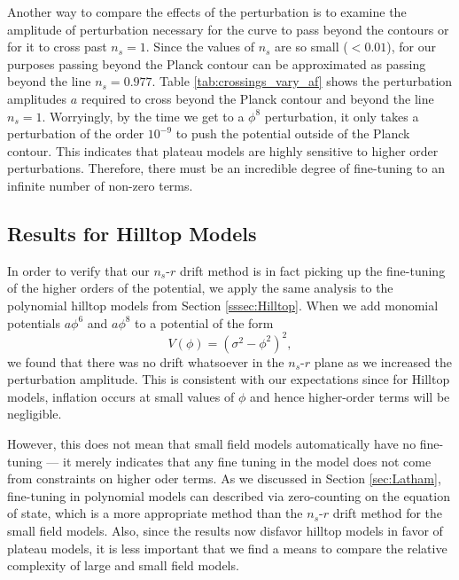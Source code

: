 \documentclass[a4paper,11pt]{article}
\def\nsr{$n_s$-$r$ }
\begin{document}
\newpage
Another way to compare the effects of the perturbation is to examine the amplitude of perturbation necessary for the curve to pass beyond the \citet{Planck2015} contours or for it to cross past $n_s=1$. Since the values of $n_s$ are so small ($<0.01$), for our purposes passing beyond the Planck contour can be approximated as passing beyond the line $n_s=0.977$. Table \ref{tab:crossings_vary_af} shows the perturbation amplitudes $a$ required to cross beyond the Planck contour and beyond the line $n_s=1$. Worryingly, by the time we get to a $\phi^8$ perturbation, it only takes a perturbation of the order $10^{-9}$ to push the potential outside of the Planck contour. This indicates that plateau models are highly sensitive to higher order perturbations. Therefore, there must be an incredible degree of fine-tuning to an infinite number of non-zero terms. 


\subsection{Results for Hilltop Models}
\label{ssec:HilltopDrift}

In order to verify that our \nsr drift method is in fact picking up the fine-tuning of the higher orders of the potential, we apply the same analysis to the polynomial hilltop models from Section \ref{sssec:Hilltop}. When we add monomial potentials $a\phi^6$ and $a\phi^8$ to a potential of the form 
\begin{equation}
V(\phi)=(\sigma^2-\phi^2)^2,
\end{equation}
we found that there was no drift whatsoever in the \nsr plane as we increased the perturbation amplitude. This is consistent with our expectations since for Hilltop models, inflation occurs at small values of $\phi$ and hence higher-order terms will be negligible. 

However, this does not mean that small field models automatically have no fine-tuning --- it merely indicates that any fine tuning in the model does not come from constraints on higher oder terms. As we discussed in Section \ref{sec:Latham}, fine-tuning in polynomial models can described via zero-counting on the equation of state, which is a more appropriate method than the \nsr drift method for the small field models. Also, since the \citet{Planck2015} results now disfavor hilltop models in favor of plateau models, it is less important that we find a means to compare the relative complexity of large and small field models. 
\end{document}
